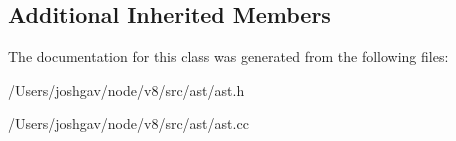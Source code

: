 \subsection*{Additional Inherited Members}


The documentation for this class was generated from the following files\+:\begin{DoxyCompactItemize}
\item 
/\+Users/joshgav/node/v8/src/ast/ast.\+h\item 
/\+Users/joshgav/node/v8/src/ast/ast.\+cc\end{DoxyCompactItemize}
